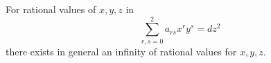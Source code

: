 \begin{conjecture}
    For rational values of $x,y,z$ in
\[
    \sum_{r,s=0}^{2}a_{rs}x^ry^s=dz^2
\]
    there exists in general an infinity of rational values for $x,y,z$.
\end{conjecture}
